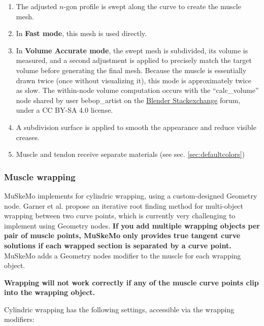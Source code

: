 \documentclass{article}
\begin{document}
\begin{enumerate}
    \item The adjusted $n$-gon profile is swept along the curve to create the muscle mesh.
    \item In \textbf{Fast mode}, this mesh is used directly.
    \item In \textbf{Volume Accurate mode}, the swept mesh is subdivided, its volume is measured, and a second adjustment is applied to precisely match the target volume before generating the final mesh. Because the muscle is essentially drawn twice (once without visualizing it), this mode is approximately twice as slow. The within-node volume computation occurs with the ``calc\_volume'' node shared by user bebop\_artist on the \href{https://blender.stackexchange.com/a/325516}{Blender Stackexchange} forum, under a CC BY-SA 4.0 license.
    \item A subdivision surface is applied to smooth the appearance and reduce visible creases.
    \item Muscle and tendon receive separate materials (see sec. \ref{sec:defaultcolors})
\end{enumerate}



\subsubsection{Muscle wrapping}
\label{sec:musclewrapping}

MuSkeMo implements \cite{garnerObstacleSetMethodRepresenting2000} for cylindric wrapping, using a custom-designed Geometry node. Garner et al. \cite{garnerObstacleSetMethodRepresenting2000} propose an iterative root finding method for multi-object wrapping between two curve points, which is currently very challenging to implement using Geometry nodes. \textbf{If you add multiple wrapping objects per pair of muscle points, MuSkeMo only provides true tangent curve solutions if each wrapped section is separated by a curve point.} MuSkeMo adds a Geometry nodes modifier to the muscle for each wrapping object.

\textbf{Wrapping will not work correctly if any of the muscle curve points clip into the wrapping object.}

Cylindric wrapping has the following settings, accessible via the wrapping modifiers:
\end{document}
